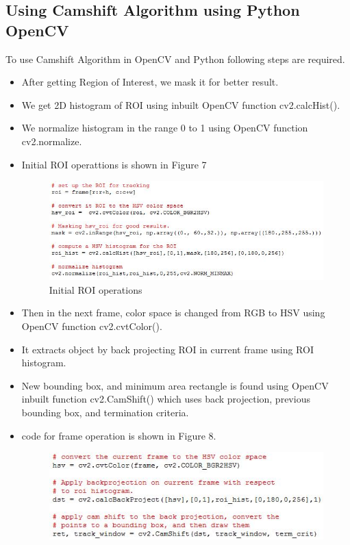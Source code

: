 \documentclass[11pt,a4paper]{article}
\begin{document}
		\subsection{Using Camshift Algorithm using Python OpenCV}
			To use Camshift Algorithm in OpenCV and Python following steps are required.
			\begin{itemize}
				\item After getting Region of Interest, we mask it for better result.
				\item We get 2D histogram of ROI using inbuilt OpenCV function cv2.calcHist().
				\item We normalize histogram in the range 0 to 1 using OpenCV function cv2.normalize.
				\item Initial ROI operattions is shown in Figure 7
				\begin{figure}[h!]
					\includegraphics[scale=0.8 ]{../Images/roi_code.JPG}
					\centering
					\caption{Initial ROI operations}
				\end{figure}
				\item Then in the next frame, color space is changed from RGB to HSV using OpenCV function cv2.cvtColor().
				\item It extracts object by back projecting ROI in current frame using ROI histogram.
				\item New bounding box, and minimum area rectangle is found using OpenCV inbuilt function cv2.CamShift() which uses back projection, previous bounding box, and termination criteria.
				\item code for frame operation is shown in Figure 8.
				\begin{figure}
					\includegraphics[scale=0.8 ]{../Images/frame_code.JPG}

\end{figure}
\end{itemize}
\end{document}
